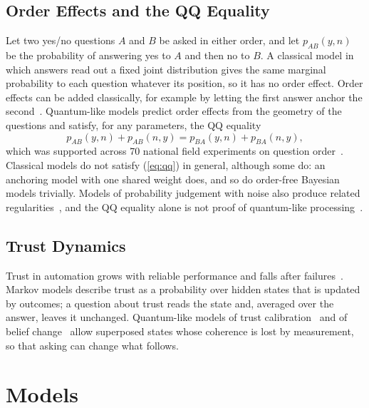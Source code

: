 \subsection{Order Effects and the QQ Equality}
Let two yes/no questions $A$ and $B$ be asked in either order, and let $p_{AB}(y,n)$ be the probability of answering yes to $A$ and then no to $B$. A classical model in which answers read out a fixed joint distribution gives the same marginal probability to each question whatever its position, so it has no order effect. Order effects can be added classically, for example by letting the first answer anchor the second~\cite{Trueblood2011}. Quantum-like models predict order effects from the geometry of the questions and satisfy, for any parameters, the QQ equality
\begin{equation}
p_{AB}(y,n)+p_{AB}(n,y)=p_{BA}(y,n)+p_{BA}(n,y),\label{eq:qq}
\end{equation}
which was supported across 70 national field experiments on question order~\cite{Wang2014}. Classical models do not satisfy (\ref{eq:qq}) in general, although some do: an anchoring model with one shared weight does, and so do order-free Bayesian models trivially. Models of probability judgement with noise also produce related regularities~\cite{Costello2014,Costello2018}, and the QQ equality alone is not proof of quantum-like processing~\cite{BoyerKassem2016,Khrennikov2014,Ozawa2021}.

\subsection{Trust Dynamics}
Trust in automation grows with reliable performance and falls after failures~\cite{Lee2004}. Markov models describe trust as a probability over hidden states that is updated by outcomes; a question about trust reads the state and, averaged over the answer, leaves it unchanged. Quantum-like models of trust calibration~\cite{Roeder2023,Humr2023} and of belief change~\cite{Busemeyer2019} allow superposed states whose coherence is lost by measurement, so that asking can change what follows.


\section{Models}\label{sec:models}
